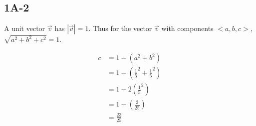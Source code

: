 \documentclass[main.tex]{subfiles}
\begin{document}
\subsection*{1A-2}

A unit vector $\vec{v}$ has $|\vec{v}| = 1$.
Thus for the vector $\vec{v}$ with components $<a, b, c>$,
$\sqrt{a^2 + b^2 + c^2} = 1$.

\begin{align*}
 c &= 1 - (a^2 + b^2)\\
  &= 1 - (\frac{1}{5}^2 + \frac{1}{5}^2)\\
  &= 1 - 2(\frac{1}{5}^2)\\
  &= 1 - (\frac{2}{25})\\
  &= \frac{23}{25}
\end{align*}
\end{document}
